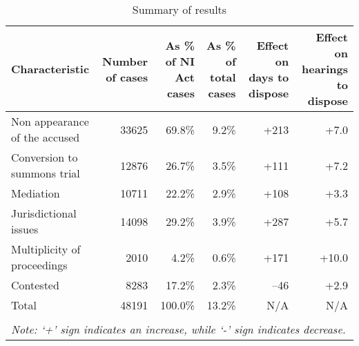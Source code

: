 {\footnotesize \begin{longtable}{@{}p{2.5cm}rrrrr}
 \caption{Summary of results}\label{tab:summary_results}\\
 \toprule
 \textbf{Characteristic} & \multicolumn{1}{p{2cm}}{\textbf{Number of cases}} &
 \multicolumn{1}{p{2cm}}{\textbf{As \% of NI Act cases}}
 & \multicolumn{1}{p{2cm}}{\textbf{As \% of total cases}}
 & \multicolumn{1}{p{2cm}}{\textbf{Effect on days to dispose}} &
 \multicolumn{1}{p{2cm}}{\textbf{Effect on hearings to dispose}}
 \\
 \midrule
 Non appearance of the accused & 33625 & 69.8\% & 9.2\% & +213 & +7.0 \\ \midrule
 Conversion to summons trial & 12876 & 26.7\% & 3.5\% & +111 & +7.2 \\ \midrule
 Mediation & 10711 & 22.2\% & 2.9\% & +108 & +3.3 \\ \midrule
 Jurisdictional issues & 14098 & 29.2\% & 3.9\% & +287 & +5.7 \\ \midrule
 Multiplicity of proceedings & 2010 & 4.2\% & 0.6\% & +171 & +10.0 \\ \midrule
 Contested & 8283 & 17.2\% & 2.3\% & --46 & +2.9 \\ \midrule
 Total & 48191 & 100.0\% & 13.2\% & N/A & N/A \\
 \bottomrule
 \\
 \multicolumn{6}{l}{{\footnotesize \emph{Note: `+' sign
 indicates an increase, while `-' sign indicates decrease.}}}\\
\end{longtable}
}

